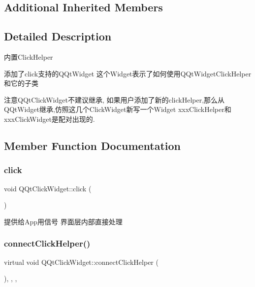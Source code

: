 \subsection*{Additional Inherited Members}


\subsection{Detailed Description}
内置\+Click\+Helper

添加了click支持的\+Q\+Qt\+Widget 这个\+Widget表示了如何使用\+Q\+Qt\+Widget\+Click\+Helper和它的子类

注意\+Q\+Qt\+Click\+Widget不建议继承, 如果用户添加了新的click\+Helper,那么从\+Q\+Qt\+Widget继承,仿照这几个\+Click\+Widget新写一个\+Widget xxx\+Click\+Helper和xxx\+Click\+Widget是配对出现的. 

\subsection{Member Function Documentation}
\mbox{\label{class_q_qt_click_widget_ac78fecd3913ed3e6dbe9df7acd3a02fe}} 
\subsubsection{\texorpdfstring{click}{click}}
{\footnotesize\ttfamily void Q\+Qt\+Click\+Widget\+::click (\begin{DoxyParamCaption}{ }\end{DoxyParamCaption})\hspace{0.3cm}{\ttfamily [signal]}}

提供给\+App用信号 界面层内部直接处理 \mbox{\label{class_q_qt_click_widget_ad70931a1404abafddd82679cd3b7c414}} 
\subsubsection{\texorpdfstring{connect\+Click\+Helper()}{connectClickHelper()}}
{\footnotesize\ttfamily virtual void Q\+Qt\+Click\+Widget\+::connect\+Click\+Helper (\begin{DoxyParamCaption}{ }\end{DoxyParamCaption})\hspace{0.3cm}{\ttfamily [inline]}, {\ttfamily [override]}, {\ttfamily [protected]}, {\ttfamily [virtual]}}

